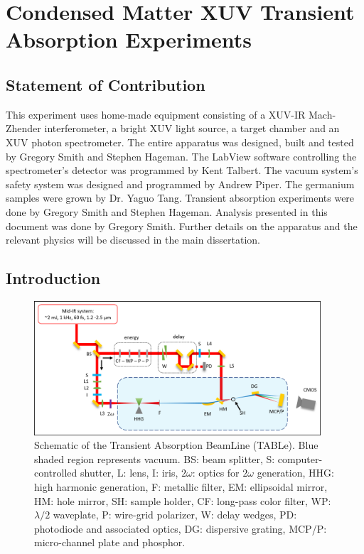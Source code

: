 \chapter{Condensed Matter XUV Transient Absorption Experiments}

\section{Statement of Contribution}
This experiment uses home-made equipment consisting of a XUV-IR Mach-Zhender interferometer, a bright XUV light source, a target chamber and an XUV photon spectrometer. The entire apparatus was designed, built and tested by Gregory Smith and Stephen Hageman. The LabView software controlling the spectrometer's detector was programmed by Kent Talbert. The vacuum system's safety system was designed and programmed by Andrew Piper. The germanium samples were grown by Dr. Yaguo Tang. Transient absorption experiments were done by Gregory Smith and Stephen Hageman. Analysis presented in this document was done by Gregory Smith. Further details on the apparatus and the relevant physics will be discussed in the main dissertation.

\section{Introduction}

\begin{figure}
	\centering
	\includegraphics[width=0.95\textwidth]{figures/chap3/beamline_schematic.png}
	\caption{Schematic of the Transient Absorption BeamLine (TABLe). Blue shaded region represents vacuum. BS: beam splitter, S: computer-controlled shutter, L: lens, I: iris, $2\omega$: optics for $2\omega$ generation, HHG: high harmonic generation, F: metallic filter, EM: ellipsoidal mirror, HM: hole mirror, SH: sample holder, CF: long-pass color filter, WP: $\lambda/2$ waveplate, P: wire-grid polarizer, W: delay wedges, PD: photodiode and associated optics, DG: dispersive grating, MCP/P: micro-channel plate and phosphor.}
	\label{fig:beamline_schematic}
\end{figure}

